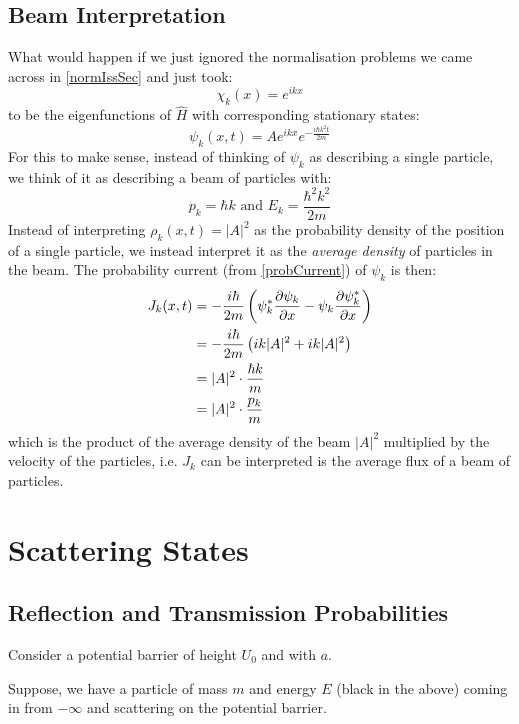 \documentclass[../main.tex]{subfiles}
\begin{document}
\subsection{Beam Interpretation}
What would happen if we just ignored the normalisation problems we came across in \cref{normIssSec} and just took:
\[
  \chi_k(x) = e^{i k x}
\]
to be the eigenfunctions of $\hat{H}$ with corresponding stationary states:
\[
  \psi_k(x, t) = A e^{ikx} e^{-\frac{i\hbar k^2 t}{2m}}
\]
For this to make sense, instead of thinking of $\psi_k$ as describing a single particle, we think of it as describing a beam of particles with:
\[
  p_k = \hbar k \text{ and } E_k = \frac{\hbar^2 k^2}{2m}
\]
Instead of interpreting $\rho_k(x, t) = |A|^2$ as the probability density of the position of a single particle, we instead interpret it as the \textit{average density} of particles in the beam.
The probability current (from \cref{probCurrent}) of $\psi_k$ is then:
\begin{align*}
  J_k(x, t) &= - \frac{i \hbar}{2m} \left(\psi^{*}_k \pderiv{\psi_k}{x} - \psi_k \pderiv{\psi^{*}_k}{x}\right) \\
            &= - \frac{i \hbar}{2m} \left(ik|A|^2 + ik|A|^2\right) \\
            &= |A|^2 \cdot \frac{\hbar k}{m} \\
            &= |A|^2 \cdot \frac{p_k}{m}
\end{align*}
which is the product of the average density of the beam $|A|^2$ multiplied by the velocity of the particles, i.e. $J_k$ can be interpreted is the average flux of a beam of particles.
\section{Scattering States}
\subsection{Reflection and Transmission Probabilities}
Consider a potential barrier of height $U_0$ and with $a$.
\begin{center}
\end{center}
Suppose, we have a particle of mass $m$ and energy $E$ (black in the above) coming in from $-\infty$ and scattering on the potential barrier.
\end{document}
